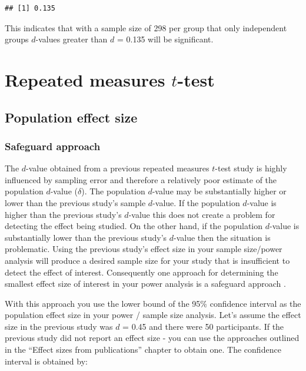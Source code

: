 \documentclass[
]{krantz}
\begin{document}
\begin{verbatim}
## [1] 0.135
\end{verbatim}

This indicates that with a sample size of 298 per group that only independent groups \(d\)-values greater than \(d\) = 0.135 will be significant.

\hypertarget{repeated-measures-t-test}{%
\section{\texorpdfstring{Repeated measures \(t\)-test}{Repeated measures t-test}}\label{repeated-measures-t-test}}

\hypertarget{population-effect-size-1}{%
\subsection{Population effect size}\label{population-effect-size-1}}

\hypertarget{safeguard-approach-1}{%
\subsubsection{Safeguard approach}\label{safeguard-approach-1}}

The \(d\)-value obtained from a previous repeated measures \(t\)-test study is highly influenced by sampling error and therefore a relatively poor estimate of the population \(d\)-value (\(\delta\)). The population \(d\)-value may be substantially higher or lower than the previous study's sample \(d\)-value. If the population \(d\)-value is higher than the previous study's \(d\)-value this does not create a problem for detecting the effect being studied. On the other hand, if the population \(d\)-value is substantially lower than the previous study's \(d\)-value then the situation is problematic. Using the previous study's effect size in your sample size/power analysis will produce a desired sample size for your study that is insufficient to detect the effect of interest. Consequently one approach for determining the smallest effect size of interest in your power analysis is a safeguard approach \citep{perugini2014safeguard}.

With this approach you use the lower bound of the 95\% confidence interval as the population effect size in your power / sample size analysis. Let's assume the effect size in the previous study was \(d\) = 0.45 and there were 50 participants. If the previous study did not report an effect size - you can use the approaches outlined in the ``Effect sizes from publications'' chapter to obtain one. The confidence interval is obtained by:
\end{document}

